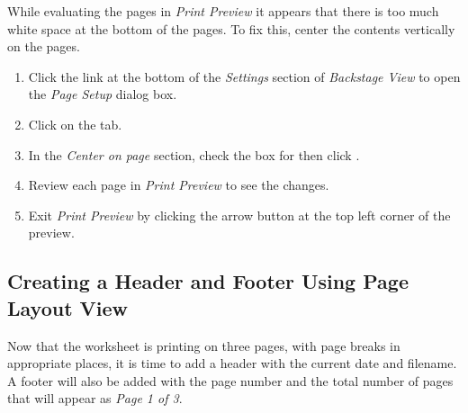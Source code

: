While evaluating the pages in \textit{Print Preview} it appears that there is too much white space at the bottom of the pages. To fix this, center the contents vertically on the pages.

\begin{enumerate}
	\item Click the  link at the bottom of the \textit{Settings} section of \textit{Backstage View} to open the \textit{Page Setup} dialog box.
	\item Click on the  tab.
	\item In the \textit{Center on page} section, check the box for  then click .
	\item Review each page in \textit{Print Preview} to see the changes. 
	\item Exit \textit{Print Preview} by clicking the arrow button at the top left corner of the preview.
\end{enumerate}

\subsection{Creating a Header and Footer Using Page Layout View}

Now that the worksheet is printing on three pages, with page breaks in appropriate places, it is time to add a header with the current date and filename. A footer will also be added with the page number and the total number of pages that will appear as \textit{Page 1 of 3}. 

